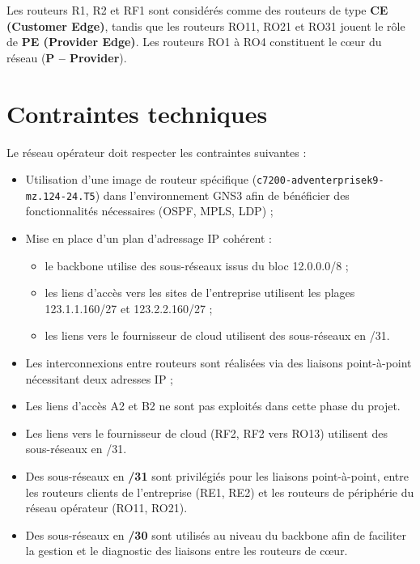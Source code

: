 \documentclass[11pt,a4paper]{memoir}%
\begin{document}
Les routeurs R1, R2 et RF1 sont considérés comme des routeurs de type \textbf{CE (Customer Edge)}, tandis que les routeurs RO11, RO21 et RO31 jouent le rôle de \textbf{PE (Provider Edge)}. Les routeurs RO1 à RO4 constituent le cœur du réseau (\textbf{P -- Provider}).

\section{Contraintes techniques}

Le réseau opérateur doit respecter les contraintes suivantes :

\begin{itemize}
	\item Utilisation d’une image de routeur spécifique (\texttt{c7200-adventerprisek9-mz.124-24.T5}) dans l’environnement GNS3 afin de bénéficier des fonctionnalités nécessaires (OSPF, MPLS, LDP) ;
	
	\item Mise en place d’un plan d’adressage IP cohérent :
	\begin{itemize}
		\item le backbone utilise des sous-réseaux issus du bloc 12.0.0.0/8 ;
		\item les liens d’accès vers les sites de l’entreprise utilisent les plages 123.1.1.160/27 et 123.2.2.160/27 ;
		\item les liens vers le fournisseur de cloud utilisent des sous-réseaux en /31.
	\end{itemize}
	
	\item Les interconnexions entre routeurs sont réalisées via des liaisons point-à-point nécessitant deux adresses IP ;
	
	\item Les liens d’accès A2 et B2 ne sont pas exploités dans cette phase du projet.
		
	\item Les liens vers le fournisseur de cloud (RF2, RF2 vers RO13) utilisent des sous-réseaux en /31.
	
	\item Des sous-réseaux en \textbf{/31} sont privilégiés pour les liaisons point-à-point,  entre les routeurs clients de l’entreprise (RE1, RE2)  et les routeurs de périphérie du réseau opérateur (RO11, RO21). 
	
	\item Des sous-réseaux en \textbf{/30} sont utilisés au niveau du backbone afin de faciliter la gestion et le diagnostic des liaisons entre les routeurs de cœur.
	
	
\end{itemize}
\end{document}
